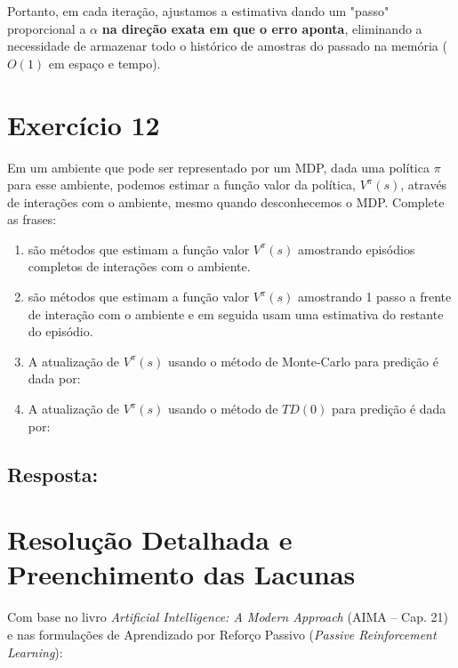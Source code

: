 \documentclass[a4paper,12pt]{article}
\begin{document}
Portanto, em cada iteração, ajustamos a estimativa dando um "passo" proporcional a $\alpha$ \textbf{na direção exata em que o erro aponta}, eliminando a necessidade de armazenar todo o histórico de amostras do passado na memória ($O(1)$ em espaço e tempo).


\section*{Exercício 12}

Em um ambiente que pode ser representado por um MDP, dada uma política $\pi$ para esse ambiente, podemos estimar a função valor da política, $V^\pi(s)$, através de interações com o ambiente, mesmo quando desconhecemos o MDP. Complete as frases:
\begin{enumerate}
	\item[\textbf{a.}] \underline{\hspace{4cm}} são métodos que estimam a função valor $V^\pi(s)$ amostrando episódios completos de interações com o ambiente.
	\item[\textbf{b.}] \underline{\hspace{4cm}} são métodos que estimam a função valor $V^\pi(s)$ amostrando 1 passo a frente de interação com o ambiente e em seguida usam uma estimativa do restante do episódio.
	\item[\textbf{c.}] A atualização de $V^\pi(s)$ usando o método de Monte-Carlo para predição é dada por: \underline{\hspace{6cm}}
	\item[\textbf{d.}] A atualização de $V^\pi(s)$ usando o método de $TD(0)$ para predição é dada por: \underline{\hspace{6cm}}
\end{enumerate}

\subsection*{Resposta:}

\bigskip

\section*{Resolução Detalhada e Preenchimento das Lacunas}

Com base no livro \textit{Artificial Intelligence: A Modern Approach} (AIMA -- Cap. 21) e nas formulações de Aprendizado por Reforço Passivo (\textit{Passive Reinforcement Learning}):
\end{document}
